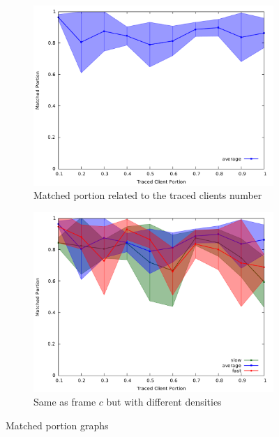 \begin{figure}
	\begin{subfigure}{.5\textwidth}
		\centering
		\includegraphics[width=1\linewidth]{graphs/c_tclient_mport_average_only.pdf}
		\caption{Matched portion related to the traced clients number}
		\label{fig:g_mportc}
	\end{subfigure}
	\begin{subfigure}{.5\textwidth}
		\centering
		\includegraphics[width=1\linewidth]{graphs/c_tclient_mport.pdf}
		\caption{Same as frame $c$ but with different densities}
		\label{fig:g_mportd}
	\end{subfigure}

	\caption{Matched portion graphs}
	\label{fig:g_mport}
\end{figure}

